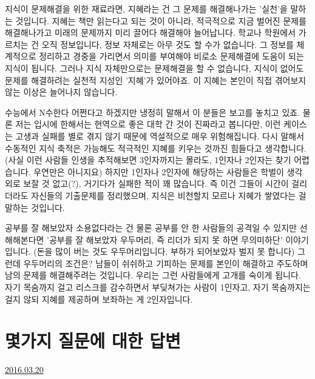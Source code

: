 지식이 문제해결을 위한 재료라면, 지혜라는 건 그 문제를 해결해나가는 '실천'을 말하는 것입니다.
지혜는 책만 읽는다고 되는 것이 아니라, 적극적으로 지금 벌어진 문제를 해결해나가고 미래의 문제까지 미리 끌어다 해결해야 늘어납니다.
학교나 학원에서 가르치는 건 오직 정보입니다, 정보 자체로는 아무 것도 할 수가 없습니다.
그 정보를 체계적으로 정리하고 경중을 가리면서 의미를 부여해야 비로소 문제해결에 도움이 되는 지식이 됩니다.
그러나 지식 자체만으로는 문제해결을 할 수 없습니다, 지식이 없어도 문제를 해결하려는 실천적 지성인 '지혜'가 있어야죠.
이 지혜는 본인이 직접 겪어보지 않는 이상은 늘어나지 않습니다.
\vspace{5mm}

수능에서 N수한다 어쩐다고 하겠지만 냉정히 말해서 이 분들은 보고를 놓치고 있죠.
물론 저는 입시에 한해서는 현역으로 좋은 대학 간 것이 진짜라고 봅니다만, 이런 케이스는 고생과 실패를 별로 겪지 않기 때문에
역설적으로 매우 위험해집니다. 다시 말해서 수동적인 지식 축적은 가능해도 적극적인 지혜를 키우는 것까진 힘들다고 생각합니다.
(사실 이런 사람들 인생을 추적해보면 3인자까지는 몰라도, 1인자나 2인자는 찾기 어렵습니다. 우연만은 아니지요)
하지만 1인자나 2인자에 해당하는 사람들은 학벌이 생각 외로 보잘 것 없고(?), 거기다가 실패한 적이 꽤 많습니다.
즉 이건 그들이 시간이 걸리더라도 자신들의 기출문제를 정리했으며, 지식은 비천할지 모르나 지혜가 쌓였다는 걸 말하는 것입니다.
\vspace{5mm}

공부를 잘 해보았자 소용없다라는 건 물론 공부를 안 한 사람들의 공격일 수 있지만
선해해본다면 '공부를 잘 해보았자 우두머리, 즉 리더가 되지 못 하면 무의미하단' 이야기입니다.
(돈을 많이 버는 것도 우두머리입니다. 부하가 되어보았자 벌지 못 합니다)
그런데 우두머리의 조건은?
남들이 쉬쉬하고 기피하는 문제를 본인이 해결하고 주도하며 남의 문제를 해결해주려는 것입니다.
우리는 그런 사람들에게 고개를 숙이게 됩니다.
자기 목숨까지 걸고 리스크를 감수하면서 부딪쳐가는 사람이 1인자고,
자기 목숨까지는 걸지 않되 지혜를 제공하며 보좌하는 게 2인자입니다.
\vspace{5mm}





\section{몇가지 질문에 대한 답변}
\href{https://www.kockoc.com/Apoc/685888}{2016.03.20}

